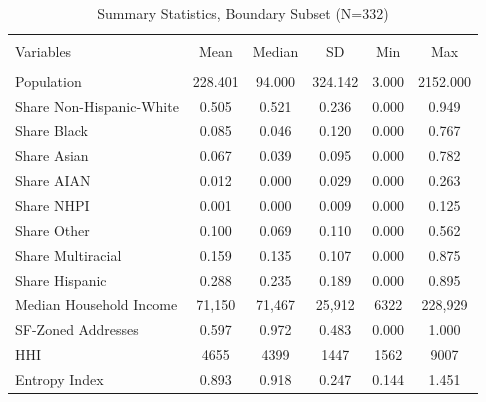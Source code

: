 \documentclass[11pt]{article}
\begin{document}
\begin{table}
\caption{Summary Statistics, Boundary Subset (N=332)}
\\[1.8ex]
\label{tab:causal_summary_stats}
\centering
\begin{tabular}[!htbp]{@{\extracolsep{5pt}}lccccc} 
\hline
\hline
\\[-1.8ex] 
Variables & Mean & Median & SD & Min & Max\\
\hline\\[-1.8ex] 
Population & 228.401 & 94.000 & 324.142 & 3.000 & 2152.000 \\

Share Non-Hispanic-White & 0.505 & 0.521 & 0.236 & 0.000 & 0.949 \\

Share Black & 0.085 & 0.046 & 0.120 & 0.000 & 0.767 \\

Share Asian & 0.067 & 0.039 & 0.095 & 0.000 & 0.782 \\

Share AIAN & 0.012 & 0.000 & 0.029 & 0.000 & 0.263 \\

Share NHPI & 0.001 & 0.000 & 0.009 & 0.000 & 0.125 \\

Share Other & 0.100 & 0.069 & 0.110 & 0.000 & 0.562 \\

Share Multiracial & 0.159 & 0.135 & 0.107 & 0.000 & 0.875 \\

Share Hispanic & 0.288 & 0.235 & 0.189 & 0.000 & 0.895 \\

Median Household Income & 71,150 & 71,467 & 25,912 & 6322 & 228,929\\

SF-Zoned Addresses & 0.597 & 0.972 & 0.483 & 0.000 & 1.000 \\

HHI & 4655 & 4399 & 1447 & 1562 & 9007 \\
Entropy Index & 0.893 & 0.918 & 0.247 & 0.144 & 1.451 \\
\hline
\hline
\end{tabular}
\end{table}
\end{document}
